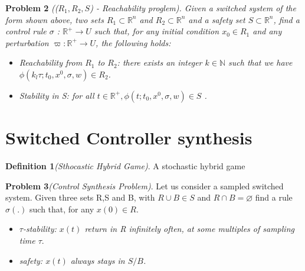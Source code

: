  
 \textbf{Problem 2} \emph{((${R_1,R_2,S}$) - Reachability proglem).
  Given a switched system of the form shown above, two sets  
  ${ R_1 \subset \mathbb{R}^n}$  and ${ R_2 \subset \mathbb{R}^n}$ 
 and a safety set  ${S \subset  \mathbb{R}^n}$, find a control rule 
 ${\sigma}$ :
  ${\mathbb{R}^+\rightarrow U}$ such that, for any initial condition 
  ${x_0  \in  R_1}$ and any perturbation  ${\varpi : \mathbb{R}^+  
  \rightarrow U}$, the following holds:}
 
 \begin{itemize}
    \item  \emph{Reachability from ${R_1}$ to ${R_2}$: there exists 
    an integer ${k \in \mathbb{N} }$ such that we have ${ \phi( k_l\tau
    ;t_0,x^0,\sigma,w) \in R_2 }$.}
    
    \item \emph{ Stability in S: for all ${ t \in \mathbb{R}^+, 
    \phi(t;t_0,x^0,\sigma,w) \in S}$ .}
\end{itemize}
 
 \section{Switched Controller synthesis}

\textbf{Definition 1}\emph{(Sthocastic Hybrid Game)}. A stochastic
 hybrid game 
 
\textbf{Problem 3}\emph{(Control Synthesis Problem)}. Let us 
consider a sampled switched system. Given three sets R,S and B, 
with ${R \cup B \in S}$  and ${R \cap B = \varnothing }$ find a 
rule ${\sigma(.)}$ such that, for any ${x(0) \in R }$. 

\begin{itemize}
    \item \emph{ ${\tau}$-stability: ${x(t)}$ return in R 
    infinitely often, at some multiples of sampling time ${\tau}$}.
    \item \emph{ safety: ${x(t)}$ always stays in ${S/B}$.}
\end{itemize}




